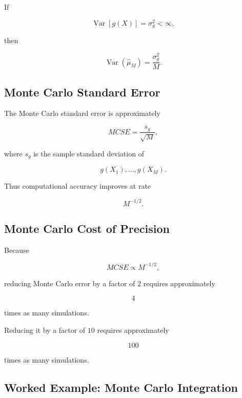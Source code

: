 If

\[
\operatorname{Var}
[
g(X)
]
=
\sigma_g^2
<
\infty,
\]

then

\[
\boxed{
\operatorname{Var}
(
\widehat{\mu}_M
)
=
\frac{
\sigma_g^2
}{
M
}.
}
\]

\subsection{Monte Carlo Standard Error}
\label{subsec:monte-carlo-se-independent}

The Monte Carlo standard error is approximately

\[
\boxed{
MCSE
=
\frac{
s_g
}{
\sqrt{M}
},
}
\]

where \(s_g\) is the sample standard deviation of

\[
g(X_1),
\ldots,
g(X_M).
\]

Thus computational accuracy improves at rate

\[
\boxed{
M^{-1/2}.
}
\]

\subsection{Monte Carlo Cost of Precision}
\label{subsec:monte-carlo-cost-precision}

Because

\[
MCSE
\propto
M^{-1/2},
\]

reducing Monte Carlo error by a factor of \(2\) requires approximately

\[
\boxed{
4
}
\]

times as many simulations.

Reducing it by a factor of \(10\) requires approximately

\[
\boxed{
100
}
\]

times as many simulations.

\subsection{Worked Example: Monte Carlo Integration}
\label{subsec:worked-monte-carlo-integration}

